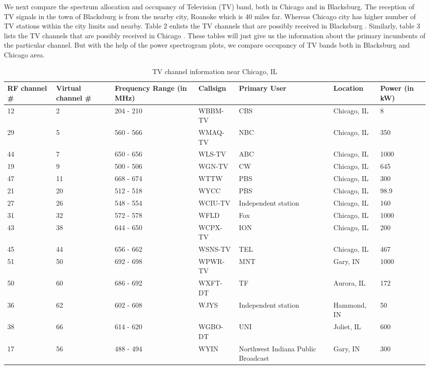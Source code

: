 \documentclass[12pt,sts]{report}
\begin{document}
	We next compare the spectrum allocation and occupancy of Television (TV) band, both in Chicago and in Blacksburg. The reception of TV signals in the town of Blacksburg is from the nearby city, Roanoke which is 40 miles far. Whereas Chicago city has higher number of TV stations within the city limits and nearby. Table 2 enlists the TV channels that are possibly received in Blacksburg \cite{tv_channel_info_blacksburg} \cite{tv_channel_frequencies}. Similarly, table 3 lists the TV channels that are possibly received in Chicago \cite{tv_channel_info_chicago} \cite{tv_channel_frequencies}. These tables will just give us the information about the primary incumbents of the particular channel. But with the help of the power spectrogram plots, we compare occupancy of TV bands both in Blacksburg and Chicago area.
	
	\begin{table}[ht!]
		\begin{tabular}{| p{2cm} | p{2cm} | p{3cm} | p{2cm} | p{2cm} | p{2cm} | p{2cm} |}
		\hline
		RF channel \#	& Virtual channel \#	& Frequency Range (in MHz)	& Callsign 	& Primary User 	& Location 	& Power (in kW) \\	\hline
		
		12 & 2 & 204 - 210 & WBBM-TV & CBS & Chicago, IL & 8 \\	\hline
		29 & 5 & 560 - 566 & WMAQ-TV & NBC & Chicago, IL & 350 \\	\hline
		44 & 7 & 650 - 656 & WLS-TV & ABC & Chicago, IL & 1000	\\	\hline
		19 & 9 & 500 - 506 & WGN-TV & CW & Chicago, IL & 645 \\	\hline
		47 & 11 & 668 - 674 & WTTW & PBS & Chicago, IL & 300 \\	\hline
		21 & 20 & 512 - 518 & WYCC & PBS & Chicago, IL & 98.9	\\	\hline
		27 & 26 & 548 - 554 & WCIU-TV & Independent station & Chicago, IL & 160 \\	\hline
		31 & 32 & 572 - 578 & WFLD & Fox & Chicago, IL & 1000	\\	\hline
		43 & 38 & 644 - 650 & WCPX-TV & ION & Chicago, IL & 200 \\	\hline
		45 & 44 & 656 - 662 & WSNS-TV & TEL & Chicago, IL & 467 \\	\hline
		51 & 50 & 692 - 698 & WPWR-TV & MNT & Gary, IN & 1000	\\	\hline
		50 & 60 & 686 - 692 & WXFT-DT & TF & Aurora, IL & 172	\\	\hline
		36 & 62 & 602 - 608 & WJYS & Independent station & Hammond, IN & 50	\\	\hline
		38 & 66 & 614 - 620 & WGBO-DT & UNI & Joliet, IL & 600	\\	\hline
		17 & 56 & 488 - 494 & WYIN & Northwest Indiana Public Broadcast & Gary, IN & 300 \\
		\hline
		\end{tabular}
		\caption{TV channel information near Chicago, IL}
	\end{table}
	
\end{document}
